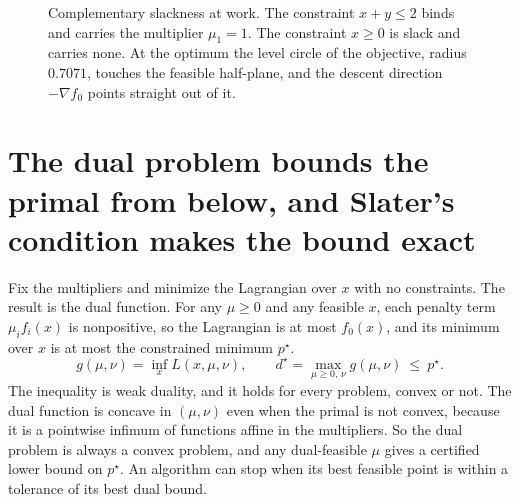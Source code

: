 \begin{figure}[tbp]
\centering
{}
\caption{Complementary slackness at work. The constraint $x+y\le2$ binds and carries the multiplier $\mu_1=1$. The constraint $x\ge0$ is slack and carries none. At the optimum the level circle of the objective, radius $0.7071$, touches the feasible half-plane, and the descent direction $-\nabla f_0$ points straight out of it.}
\label{fig:ch04:kkt}
\end{figure}


\section{The dual problem bounds the primal from below, and Slater's condition makes the bound exact}\label{sec:ch04:dual}

Fix the multipliers and minimize the Lagrangian over $x$ with no constraints. The result is the dual function. For any $\mu\ge0$ and any feasible $x$, each penalty term $\mu_if_i(x)$ is nonpositive, so the Lagrangian is at most $f_0(x)$, and its minimum over $x$ is at most the constrained minimum $p^\star$.
\begin{equation}\label{eq:ch04:dual}
g(\mu,\nu)=\inf_x L(x,\mu,\nu),\qquad
d^\star=\max_{\mu\ge0,\,\nu}g(\mu,\nu)\ \le\ p^\star .
\end{equation}
The inequality is weak duality, and it holds for every problem, convex or not. The dual function is concave in $(\mu,\nu)$ even when the primal is not convex, because it is a pointwise infimum of functions affine in the multipliers. So the dual problem is always a convex problem, and any dual-feasible $\mu$ gives a certified lower bound on $p^\star$. An algorithm can stop when its best feasible point is within a tolerance of its best dual bound.


